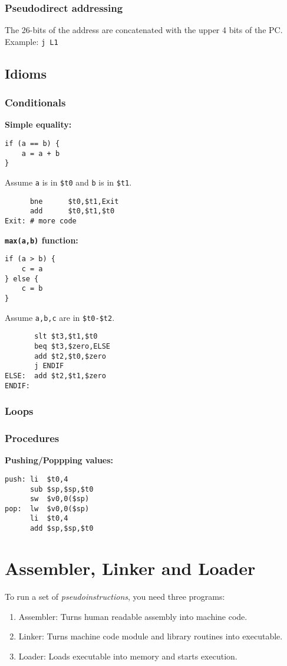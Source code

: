 \documentclass{article}
\newcommand{\T}[1]{\texttt{#1}}
\begin{document}
\subsubsection{Pseudodirect addressing}
The 26-bits of the address are concatenated with the upper 4 bits of the PC.\\
Example: \T{j L1}
\subsection{Idioms}
\subsubsection{Conditionals}
\textbf{Simple equality:}
\begin{verbatim}
if (a == b) {
	a = a + b
}
\end{verbatim}
Assume \T{a} is in \T{\$t0} and \T{b} is in \T{\$t1}.
\begin{verbatim}
      bne      $t0,$t1,Exit
      add      $t0,$t1,$t0
Exit: # more code
\end{verbatim}
\textbf{\T{max(a,b)} function:}
\begin{verbatim}
if (a > b) {
	c = a
} else {
	c = b
}
\end{verbatim}
Assume \T{a,b,c} are in \T{\$t0-\$t2}.
\begin{verbatim}
       slt $t3,$t1,$t0
       beq $t3,$zero,ELSE
       add $t2,$t0,$zero
       j ENDIF
ELSE:  add $t2,$t1,$zero
ENDIF: 
\end{verbatim}
\subsubsection{Loops}
\subsubsection{Procedures}
\textbf{Pushing/Poppping values:}
\begin{verbatim}
push: li  $t0,4
      sub $sp,$sp,$t0
      sw  $v0,0($sp)
pop:  lw  $v0,0($sp)
      li  $t0,4
      add $sp,$sp,$t0
\end{verbatim}
\section{Assembler, Linker and Loader}
To run a set of \emph{pseudoinstructions}, you need three programs:
\begin{enumerate}
	\item Assembler: Turns human readable assembly into machine code.
	\item Linker: Turns machine code module and library routines into executable.
	\item Loader: Loads executable into memory and starts execution.
\end{enumerate}
\end{document}
